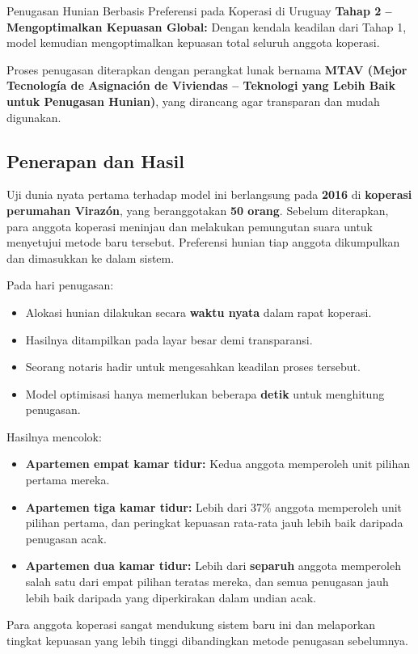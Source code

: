 \begin{casestudybox}{Penugasan Hunian Berbasis Preferensi pada Koperasi di Uruguay}
\textbf{Tahap 2 – Mengoptimalkan Kepuasan Global:} Dengan kendala keadilan dari Tahap 1, model kemudian mengoptimalkan kepuasan total seluruh anggota koperasi.

Proses penugasan diterapkan dengan perangkat lunak bernama \textbf{MTAV (Mejor Tecnología de Asignación de Viviendas – Teknologi yang Lebih Baik untuk Penugasan Hunian)}, yang dirancang agar transparan dan mudah digunakan.

\subsection*{Penerapan dan Hasil}
Uji dunia nyata pertama terhadap model ini berlangsung pada \textbf{2016} di \textbf{koperasi perumahan Virazón}, yang beranggotakan \textbf{50 orang}. Sebelum diterapkan, para anggota koperasi meninjau dan melakukan pemungutan suara untuk menyetujui metode baru tersebut. Preferensi hunian tiap anggota dikumpulkan dan dimasukkan ke dalam sistem.

Pada hari penugasan:
\begin{itemize}
    \item Alokasi hunian dilakukan secara \textbf{waktu nyata} dalam rapat koperasi.
    \item Hasilnya ditampilkan pada layar besar demi transparansi.
    \item Seorang notaris hadir untuk mengesahkan keadilan proses tersebut.
    \item Model optimisasi hanya memerlukan beberapa \textbf{detik} untuk menghitung penugasan.
\end{itemize}

Hasilnya mencolok:
\begin{itemize}
    \item \textbf{Apartemen empat kamar tidur:} Kedua anggota memperoleh unit pilihan pertama mereka.
    \item \textbf{Apartemen tiga kamar tidur:} Lebih dari 37\% anggota memperoleh unit pilihan pertama, dan peringkat kepuasan rata-rata jauh lebih baik daripada penugasan acak.
    \item \textbf{Apartemen dua kamar tidur:} Lebih dari \textbf{separuh} anggota memperoleh salah satu dari empat pilihan teratas mereka, dan semua penugasan jauh lebih baik daripada yang diperkirakan dalam undian acak.
\end{itemize}

Para anggota koperasi sangat mendukung sistem baru ini dan melaporkan tingkat kepuasan yang lebih tinggi dibandingkan metode penugasan sebelumnya.


\end{casestudybox}
